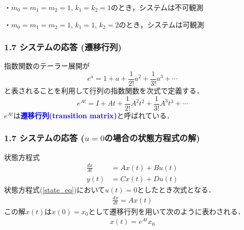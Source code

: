 \documentclass[10pt]{beamer}
\begin{document}
\begin{frame}[t]
・$m_0=m_1=m_2=1$, $k_1=k_2=1$のとき，システムは不可観測

・$m_0=m_1=m_2=1$, $k_1=1$, $k_2=2$のとき，システムは可観測
\end{frame}


\begin{frame}[t]
\frametitle{1.7 システムの応答 (遷移行列)}
指数関数のテーラー展開が
\begin{equation}
  e^{a} = 1 + a + \frac{1}{2!} a^2
        + \frac{1}{3!} a^3  + \cdots
\end{equation}
と表されることを利用して行列の指数関数を次式で定義する．
\begin{equation}
 e^{At} = I + At + \frac{1}{2!} A^2 t^2
        + \frac{1}{3!} A^3 t^3 + \cdots
\end{equation}
$e^{At}$は\textcolor{blue}{\bf {遷移行列}(transition matrix)}と呼ばれている．
\end{frame}


\begin{frame}[t]
\frametitle{1.7 システムの応答 ($u=0$の場合の状態方程式の解)}
状態方程式
\begin{align}
   \frac{dx}{dt} &= A x(t) + B u(t)  \\
   y(t) &= C x(t) + D u(t) 
\end{align}
状態方程式(\ref{state_eq})において$u(t) = 0$としたとき次式となる．
\begin{align}
\frac{dx}{dt} = Ax(t) 
\end{align}
この解$x(t)$は$x(0)=x_0$として遷移行列を用いて次のように表わされる．
\begin{align}
 x(t) = e^{At} x_0 
\end{align}
\end{frame}
\end{document}
